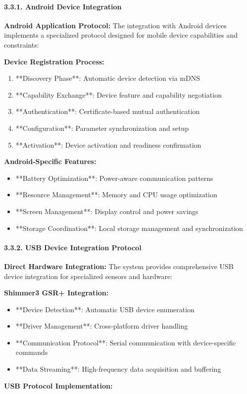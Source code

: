 \documentclass[11pt,a4paper]{article}
\begin{document}
\paragraph{3.3.1. Android Device Integration}

\textbf{Android Application Protocol:}
The integration with Android devices implements a specialized protocol designed for mobile device capabilities and
constraints:

\textbf{Device Registration Process:}

\begin{enumerate}
\item **Discovery Phase**: Automatic device detection via mDNS
\item **Capability Exchange**: Device feature and capability negotiation
\item **Authentication**: Certificate-based mutual authentication
\item **Configuration**: Parameter synchronization and setup
\item **Activation**: Device activation and readiness confirmation

\end{enumerate}
\textbf{Android-Specific Features:}

\begin{itemize}
\item **Battery Optimization**: Power-aware communication patterns
\item **Resource Management**: Memory and CPU usage optimization
\item **Screen Management**: Display control and power savings
\item **Storage Coordination**: Local storage management and synchronization

\end{itemize}
\paragraph{3.3.2. USB Device Integration Protocol}

\textbf{Direct Hardware Integration:}
The system provides comprehensive USB device integration for specialized sensors and hardware:

\textbf{Shimmer3 GSR+ Integration:}

\begin{itemize}
\item **Device Detection**: Automatic USB device enumeration
\item **Driver Management**: Cross-platform driver handling
\item **Communication Protocol**: Serial communication with device-specific commands
\item **Data Streaming**: High-frequency data acquisition and buffering

\end{itemize}
\textbf{USB Protocol Implementation:}
\end{document}
